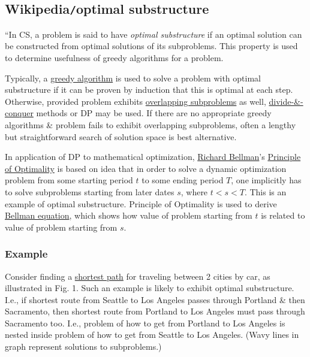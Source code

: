 \documentclass{article}
\begin{document}

\subsection{Wikipedia{\tt/}optimal substructure}
``In CS, a problem is said to have {\it optimal substructure} if an optimal solution can be constructed from optimal solutions of its subproblems. This property is used to determine usefulness of greedy algorithms for a problem.

Typically, a \href{https://en.wikipedia.org/wiki/Greedy_algorithm}{greedy algorithm} is used to solve a problem with optimal substructure if it can be proven by induction that this is optimal at each step. Otherwise, provided problem exhibits \href{https://en.wikipedia.org/wiki/Overlapping_subproblems}{overlapping subproblems} as well, \href{https://en.wikipedia.org/wiki/Divide_and_conquer_algorithm}{divide-\&-conquer} methods or DP may be used. If there are no appropriate greedy algorithms \& problem fails to exhibit overlapping subproblems, often a lengthy but straightforward search of solution space is best alternative.

In application of DP to mathematical optimization, \href{https://en.wikipedia.org/wiki/Richard_Bellman}{\sc Richard Bellman}'s \href{https://en.wikipedia.org/wiki/Bellman_equation#Bellman's_principle_of_optimality}{Principle of Optimality} is based on idea that in order to solve a dynamic optimization problem from some starting period $t$ to some ending period $T$, one implicitly has to solve subproblems starting from later dates $s$, where $t < s < T$. This is an example of optimal substructure. Principle of Optimality is used to derive \href{https://en.wikipedia.org/wiki/Bellman_equation}{Bellman equation}, which shows how value of problem starting from $t$ is related to value of problem starting from $s$.

\subsubsection{Example}
Consider finding a \href{https://en.wikipedia.org/wiki/Shortest_path_problem}{shortest path} for traveling between 2 cities by car, as illustrated in Fig. 1. Such an example is likely to exhibit optimal substructure. I.e., if shortest route from Seattle to Los Angeles passes through Portland \& then Sacramento, then shortest route from Portland to Los Angeles must pass through Sacramento too. I.e., problem of how to get from Portland to Los Angeles is nested inside problem of how to get from Seattle to Los Angeles. (Wavy lines in graph represent solutions to subproblems.)
\end{document}
